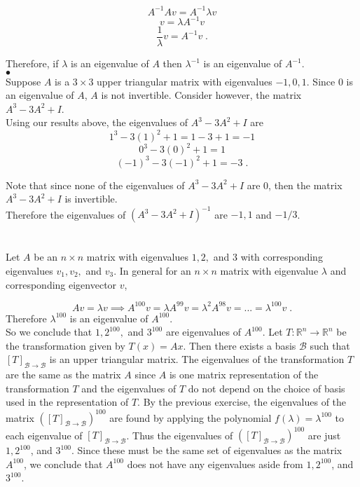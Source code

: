 \documentclass[11pt]{article}
\begin{document}
$$A^{-1}Av = A^{-1}\lambda v$$
$$v = \lambda A^{-1} v$$
$$\frac{1}{\lambda} v = A^{-1} v \;.$$

Therefore, if $\lambda$ is an eigenvalue of $A$ then $\lambda^{-1}$ is an eigenvalue of $A^{-1}$.\\

$\bullet$\\

Suppose $A$ is a $3 \times 3$ upper triangular matrix with eigenvalues $-1, 0,1$. Since $0$ is an eigenvalue of $A$, $A$ is not invertible. Consider however, the matrix $A^3 - 3A^2 + I$. \\

Using our results above, the eigenvalues of $A^3 - 3A^2 + I$ are $$1^3 -3(1)^2+ 1 = 1-3+1 = -1$$
$$0^3 - 3(0)^2 + 1 = 1$$
$$(-1)^3 - 3(-1)^2 + 1 = -3 \;.$$

Note that since none of the eigenvalues of $A^3-3A^2 + I$ are 0, then the matrix $A^3 - 3A^2 + I$ is invertible.\\

Therefore the eigenvalues of $(A^3 - 3A^2 + I)^{-1}$ are $-1, 1$ and $-1/3$. 

\section{}
Let $A$ be an $n \times n$ matrix with eigenvalues $1,2,$ and $3$ with corresponding eigenvalues $v_1, v_2,$ and $v_3$. In general for an $n \times n$ matrix with eigenvalue $\lambda$ and corresponding eigenvector $v$,

$$Av = \lambda v \implies A^{100}v = \lambda A^{99} v = \lambda^2 A^{98} v = ... = \lambda^{100} v\;. $$
Therefore $\lambda^{100}$ is an eigenvalue of $A^{100}$. \\


So we conclude that $1, 2^{100},$ and $3^{100}$ are eigenvalues of $A^{100}$. Let $T : \mathbb{R}^n \rightarrow \mathbb{R}^n$ be the transformation given by $T(x) = Ax$. Then there exists a basis $\mathcal{B}$ such that $[T]_{\mathcal{B} \rightarrow \mathcal{B}}$ is an upper triangular matrix. The eigenvalues of the transformation $T$ are the same as the matrix $A$ since $A$ is one matrix representation of the transformation $T$ and the eigenvalues of $T$ do not depend on the choice of basis used in the representation of $T$. By the previous exercise, the eigenvalues of the matrix $([T]_{\mathcal{B} \rightarrow \mathcal{B}})^{100}$ are found by applying the polynomial $f(\lambda) = \lambda^{100}$ to each eigenvalue of $[T]_{\mathcal{B} \rightarrow \mathcal{B}}$. Thus the eigenvalues of  $([T]_{\mathcal{B} \rightarrow \mathcal{B}})^{100}$ are just $1, 2^{100}$, and $3^{100}$. Since these must be the same set of eigenvalues as the matrix $A^{100}$, we conclude that $A^{100}$ does not have any eigenvalues aside from $1,2^{100}$, and $3^{100}$.
\end{document}
